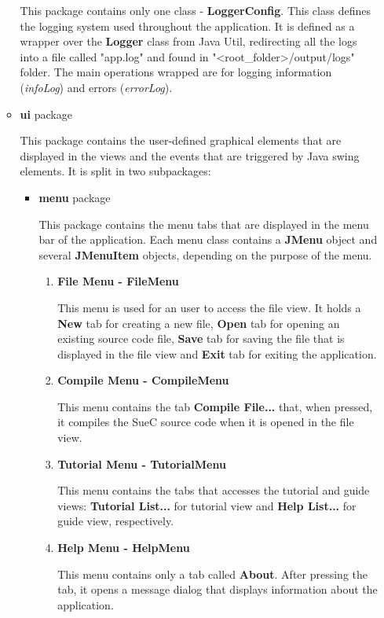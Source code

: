 \documentclass[12pt,a4paper,twoside]{report}
\begin{document}
\begin{enumerate}
\begin{itemize}
 This package contains only one class - \textbf{LoggerConfig}. This class defines the logging system used throughout the application. It is defined as a wrapper over the \textbf{Logger} class from Java Util, redirecting all the logs into a file called "app.log" and found in "<root\_folder>/output/logs" folder. The main operations wrapped are for logging information (\textit{infoLog}) and errors (\textit{errorLog}).
 
 
\item \textbf{ui} package

This package contains the user-defined graphical elements that are displayed in the views and the events that are triggered by Java swing elements. It is split in two subpackages:  
\begin{itemize}
	\item \textbf{menu} package
	
	This package contains the menu tabs that are displayed in the menu bar of the application. Each menu class contains a \textbf{JMenu} object and several \textbf{JMenuItem} objects, depending on the purpose of the menu. 
	\begin{enumerate}
	\item  \textbf{File Menu - FileMenu} 
	
	This menu is used for an user to access the file view. It holds a \textbf{New} tab for creating a new file, \textbf{Open} tab for opening an existing source code file, \textbf{Save} tab for saving the file that is displayed in the file view and \textbf{Exit} tab for exiting the application. 
	
	\item \textbf{Compile Menu - CompileMenu}
	
	This menu contains the tab \textbf{Compile File...} that, when pressed, it compiles the SueC source code when it is opened in the file view. 
	
	\item \textbf{Tutorial Menu - TutorialMenu}
	
	This menu contains the tabs that accesses the tutorial and guide views: \textbf{Tutorial List...} for tutorial view and \textbf{Help List...} for guide view, respectively.
	
	\item \textbf{Help Menu - HelpMenu}
	
	This menu contains only a tab called \textbf{About}. After pressing the tab, it opens a message dialog that displays information about the application.
	\end{enumerate}
	

\end{itemize}
\end{itemize}
\end{enumerate}
\end{document}

